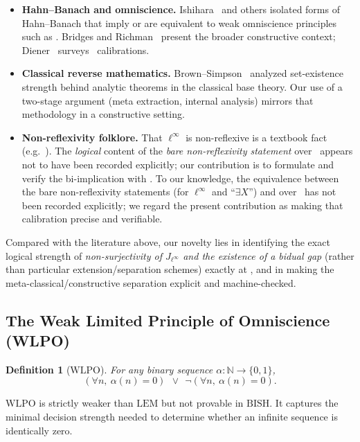 \documentclass[11pt]{article}
\newtheorem{definition}[theorem]{Definition}
\newenvironment{defi}{\begin{definition}}{\end{definition}}
\newcommand{\N}{\mathbb{N}}
\newcommand{\WLPO}{\mathrm{WLPO}}
\newcommand{\BISH}{\mathrm{BISH}}
\newcommand{\CRM}{\mathrm{CRM}}
\newcommand{\LEM}{\mathrm{LEM}}
\begin{document}
\begin{itemize}[leftmargin=2em]
\item \textbf{Hahn--Banach and omniscience.} Ishihara~\cite{Ishihara90,Ishihara06} and others isolated forms of Hahn--Banach that imply or are equivalent to weak omniscience principles such as \WLPO. Bridges and Richman~\cite{Bridges87} present the broader constructive context; Diener~\cite{DienerCRM} surveys \CRM\ calibrations.

\item \textbf{Classical reverse mathematics.} Brown--Simpson~\cite{BrownSimpson86} analyzed set-existence strength behind analytic theorems in the classical base theory. Our use of a two-stage argument (meta extraction, internal analysis) mirrors that methodology in a constructive setting.

\item \textbf{Non-reflexivity folklore.} That $\ell^\infty$ is non-reflexive is a textbook fact (e.g.\ \cite{ConwayFA,Megginson98,AlbiacKalton16}). The \emph{logical} content of the \emph{bare non-reflexivity statement} over \BISH\ appears not to have been recorded explicitly; our contribution is to formulate and verify the bi-implication with \WLPO. To our knowledge, the equivalence between the bare non-reflexivity statements (for $\ell^\infty$ and ``$\exists X$'') and \WLPO over \BISH\ has not been recorded explicitly; we regard the present contribution as making that calibration precise and verifiable.
\end{itemize}

Compared with the literature above, our novelty lies in identifying the exact logical strength of \emph{non-surjectivity of $J_{\ell^\infty}$ and the existence of a bidual gap} (rather than particular extension/separation schemes) exactly at \WLPO, and in making the meta-classical/constructive separation explicit and machine-checked.

\subsection{The Weak Limited Principle of Omniscience (WLPO)}

\begin{defi}[$\WLPO$]
For any binary sequence $\alpha:\N\to\{0,1\}$,
\[
(\forall n,\ \alpha(n)=0)\ \ \vee\ \ \neg(\forall n,\ \alpha(n)=0).
\]
\end{defi}

$\WLPO$ is strictly weaker than $\LEM$ but not provable in $\BISH$. It captures the minimal decision strength needed to determine whether an infinite sequence is identically zero.
\end{document}
